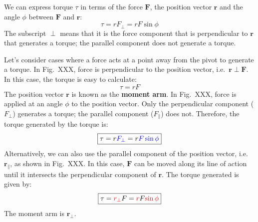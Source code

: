 We can express torque $\tau$ in terms of the force $\bm F$, the position
vector $\bm r$ and the angle $\phi$ between $\bm F$ and $\bm r$:
\begin{equation}
  \boxed{
    \tau=rF_\perp=rF\sin\phi
  }
\end{equation}
The subscript $\perp$ means that it is the force component that is
perpendicular to $\bm r$ that generates a torque; the parallel component does
not generate a torque.

Let's consider cases where a force acts at a point away from the pivot to
generate a torque. In Fig.\ XXX, force is perpendicular to the position vector,
i.e.\ $\bm r\perp\bm F$. In this case, the torque is easy to calculate:
\begin{equation*}
  \tau = rF
\end{equation*}
The position vector $\bm r$ is known as the \textbf{moment arm}. In
Fig.\ XXX, force is applied at an angle $\phi$ to the position vector. Only the
perpendicular component ($F_\perp$) generates a torque; the parallel component
($F_\parallel$) does not. Therefore, the torque generated by the torque is:
\begin{equation*}
  \boxed{
    \tau = r{\color{blue}F_\perp}=r{\color{blue}F\sin\phi}
  }
\end{equation*}
Alternatively, we can also use the parallel component of the position vector,
i.e.\ $\bm r_\parallel$, as shown in Fig.\ XXX. In this case, $\bm F$ can be
moved along its line of action until it intersects the perpendicular component
of $\bm r$. The torque
generated is given by:
\begin{equation*}
  \boxed{
    \tau = {\color{red}r_\perp}F
    ={\color{red}r}F{\color{red}\sin\phi}
  }
\end{equation*}
The moment arm is $\bm r_\perp$.



